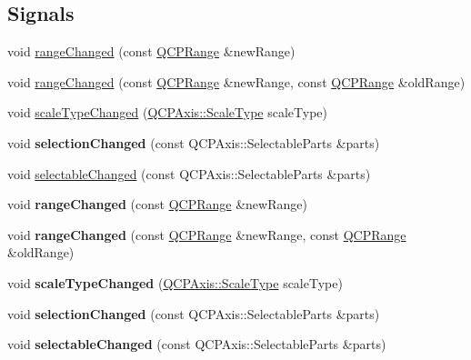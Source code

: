 \subsection*{Signals}
\begin{DoxyCompactItemize}
\item 
void \hyperlink{class_q_c_p_axis_a0894084e4c16a1736534c4095746f910}{range\+Changed} (const \hyperlink{class_q_c_p_range}{Q\+C\+P\+Range} \&new\+Range)
\item 
void \hyperlink{class_q_c_p_axis_aac8576288e8e31f16186124bc10dd10d}{range\+Changed} (const \hyperlink{class_q_c_p_range}{Q\+C\+P\+Range} \&new\+Range, const \hyperlink{class_q_c_p_range}{Q\+C\+P\+Range} \&old\+Range)
\item 
void \hyperlink{class_q_c_p_axis_a3505ed8a93bd2e349d858d84996bf767}{scale\+Type\+Changed} (\hyperlink{class_q_c_p_axis_a36d8e8658dbaa179bf2aeb973db2d6f0}{Q\+C\+P\+Axis\+::\+Scale\+Type} scale\+Type)
\item 
\mbox{\label{class_q_c_p_axis_a62b598abeee7174a05f9d542cc85b1f5}} 
void {\bfseries selection\+Changed} (const Q\+C\+P\+Axis\+::\+Selectable\+Parts \&parts)
\item 
void \hyperlink{class_q_c_p_axis_aa5ff1fd851139028a3bb4efcb31de9fc}{selectable\+Changed} (const Q\+C\+P\+Axis\+::\+Selectable\+Parts \&parts)
\item 
\mbox{\label{class_q_c_p_axis_a0894084e4c16a1736534c4095746f910}} 
void {\bfseries range\+Changed} (const \hyperlink{class_q_c_p_range}{Q\+C\+P\+Range} \&new\+Range)
\item 
\mbox{\label{class_q_c_p_axis_aac8576288e8e31f16186124bc10dd10d}} 
void {\bfseries range\+Changed} (const \hyperlink{class_q_c_p_range}{Q\+C\+P\+Range} \&new\+Range, const \hyperlink{class_q_c_p_range}{Q\+C\+P\+Range} \&old\+Range)
\item 
\mbox{\label{class_q_c_p_axis_a3505ed8a93bd2e349d858d84996bf767}} 
void {\bfseries scale\+Type\+Changed} (\hyperlink{class_q_c_p_axis_a36d8e8658dbaa179bf2aeb973db2d6f0}{Q\+C\+P\+Axis\+::\+Scale\+Type} scale\+Type)
\item 
\mbox{\label{class_q_c_p_axis_a62b598abeee7174a05f9d542cc85b1f5}} 
void {\bfseries selection\+Changed} (const Q\+C\+P\+Axis\+::\+Selectable\+Parts \&parts)
\item 
\mbox{\label{class_q_c_p_axis_aa5ff1fd851139028a3bb4efcb31de9fc}} 
void {\bfseries selectable\+Changed} (const Q\+C\+P\+Axis\+::\+Selectable\+Parts \&parts)
\end{DoxyCompactItemize}
